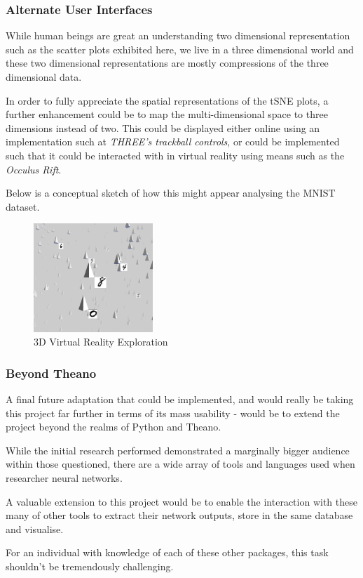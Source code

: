 \documentclass[a4paper,11pt,titlepage]{article}
\begin{document}
	\subsubsection{Alternate User Interfaces}	
	While human beings are great an understanding two dimensional representation such as the scatter plots exhibited here, we live in a three dimensional world and these two dimensional representations are mostly compressions of the three dimensional data.
	\par 
	In order to fully appreciate the spatial representations of the tSNE plots, a further enhancement could be to map the multi-dimensional space to three dimensions instead of two. This could be displayed either online using an implementation such at \textit{THREE's trackball controls}, or could be implemented such that it could be interacted with in virtual reality using means such as the \textit{Occulus Rift}.
	\par 
	Below is a conceptual sketch of how this might appear analysing the MNIST dataset.
		
	\begin{figure}[H]
		\centering 
    		\includegraphics[width=0.4\textwidth]{img/occulus_rift.png} 
    		\caption{3D Virtual Reality Exploration}%
 	\end{figure}
		
	\subsubsection{Beyond Theano}
	A final future adaptation that could be implemented, and would really be taking this project far further in terms of its mass usability - would be to extend the project beyond the realms of Python and Theano.
	\par 
	While the initial research performed demonstrated a marginally bigger audience within those questioned, there are a wide array of tools and languages used when researcher neural networks. 
	\par 
	A valuable extension to this project would be to enable the interaction with these many of other tools to extract their network outputs, store in the same database and visualise. 
	\par 
	For an individual with knowledge of each of these other packages, this task shouldn't be tremendously challenging.
	
\end{document}
